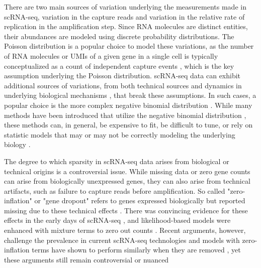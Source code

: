 There are two main sources of variation underlying the measurements made in scRNA-seq,
variation in the capture reads and variation in the relative rate of replication in the amplification step.
Since RNA molecules are distinct entities, their abundances are modeled using discrete probability distributions.
The Poisson distribution is a popular choice to model these variations,
as the number of RNA molecules or UMIs of a given gene in a single cell is typically conceptualized as a count of independent capture events \cite{breda2021},
which is the key assumption underlying the Poisson distribution.
scRNA-seq data can exhibit additional sources of variations, from both technical sources and dynamics in underlying biological mechanisms \cite{hicks2018},
that break these assumptions.
In such cases, a popular choice is the more complex negative binomial distribution \cite{choudhary2022}.
While many methods have been introduced that utilize the negative binomial distribution \cite{lopez2018, risso2018, eraslan2019},
these methods can, in general, be expensive to fit, be difficult to tune, or rely on statistic models that may or may not be correctly modeling the underlying biology \cite{ahlmann-eltze2023}.

The degree to which sparsity in scRNA-seq data arises from biological or technical origins is a controversial issue.
While missing data or zero gene counts can arise from biologically unexpressed genes, they can also arise from technical artifacts,
such as failure to capture reads before amplification.
So called "zero-inflation" or "gene dropout" refers to genes expressed biologically but reported missing due to these technical effects \cite{silverman2020}.
There was convincing evidence for these effects in the early days of scRNA-seq \cite{vallejos2017},
and likelihood-based models were enhanced with mixture terms to zero out counts \cite{pierson2015, dijk2018, lopez2018, huang2018, eraslan2019}.
Recent arguments, however, challenge the prevalence in current scRNA-seq technologies \cite{svensson2020,jiang2022}
and models with zero-inflation terms have shown to perform similarly when they are removed \cite{vieth2017},
yet these arguments still remain controversial or nuanced \cite{cao2021}

